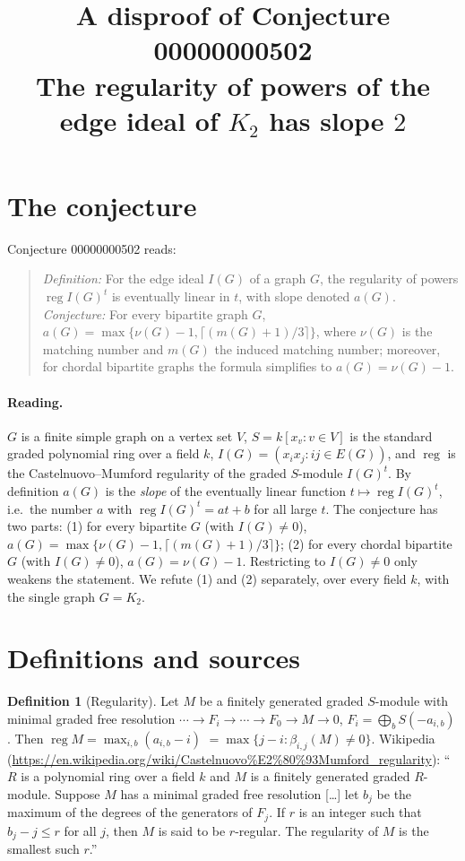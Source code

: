 \documentclass[11pt]{article}
\title{A disproof of Conjecture 00000000502\\[2pt]
\large The regularity of powers of the edge ideal of $K_2$ has slope $2$}
\date{}
\theoremstyle{definition}
\newtheorem{definition}[theorem]{Definition}
\theoremstyle{remark}
\renewcommand{\_}{\oldus\allowbreak}
\newcommand{\reg}{\operatorname{reg}}
\begin{document}
\sloppy
\maketitle

\section{The conjecture}

Conjecture 00000000502 reads:

\begin{quote}
\emph{Definition:} For the edge ideal $I(G)$ of a graph $G$, the regularity of powers $\reg I(G)^t$ is
eventually linear in $t$, with slope denoted $a(G)$. \emph{Conjecture:} For every bipartite graph $G$,
$a(G) = \max\{\nu(G)-1, \lceil (m(G)+1)/3\rceil\}$, where $\nu(G)$ is the matching number and $m(G)$ the
induced matching number; moreover, for chordal bipartite graphs the formula simplifies to
$a(G)=\nu(G)-1$.
\end{quote}

\paragraph{Reading.} $G$ is a finite simple graph on a vertex set $V$, $S = k[x_v : v \in V]$ is the
standard graded polynomial ring over a field $k$, $I(G) = (x_ix_j : ij \in E(G))$, and $\reg$ is the
Castelnuovo--Mumford regularity of the graded $S$-module $I(G)^t$. By definition $a(G)$ is the
\emph{slope} of the eventually linear function $t \mapsto \reg I(G)^t$, i.e.\ the number $a$ with
$\reg I(G)^t = a t + b$ for all large $t$. The conjecture has two parts:
(1) for every bipartite $G$ (with $I(G) \neq 0$), $a(G) = \max\{\nu(G)-1, \lceil (m(G)+1)/3\rceil\}$;
(2) for every chordal bipartite $G$ (with $I(G)\ne 0$), $a(G) = \nu(G)-1$.
Restricting to $I(G) \neq 0$ only weakens the statement. We refute (1) and (2) separately, over every
field $k$, with the single graph $G = K_2$.

\section{Definitions and sources}

\begin{definition}[Regularity]\label{def:reg}
Let $M$ be a finitely generated graded $S$-module with minimal graded free resolution
$\cdots \to F_i \to \cdots \to F_0 \to M \to 0$, $F_i = \bigoplus_b S(-a_{i,b})$. Then
$\reg M = \max_{i,b} (a_{i,b} - i)$ $= \max\{j - i : \beta_{i,j}(M) \neq 0\}$. Wikipedia
(\url{https://en.wikipedia.org/wiki/Castelnuovo\%E2\%80\%93Mumford_regularity}): ``$R$ is a polynomial ring
over a field $k$ and $M$ is a finitely generated graded $R$-module. Suppose $M$ has a minimal graded free
resolution [\dots] let $b_j$ be the maximum of the degrees of the generators of $F_j$. If $r$ is an integer
such that $b_j - j \le r$ for all $j$, then $M$ is said to be $r$-regular. The regularity of $M$ is the
smallest such $r$.''
\end{definition}
\end{document}
